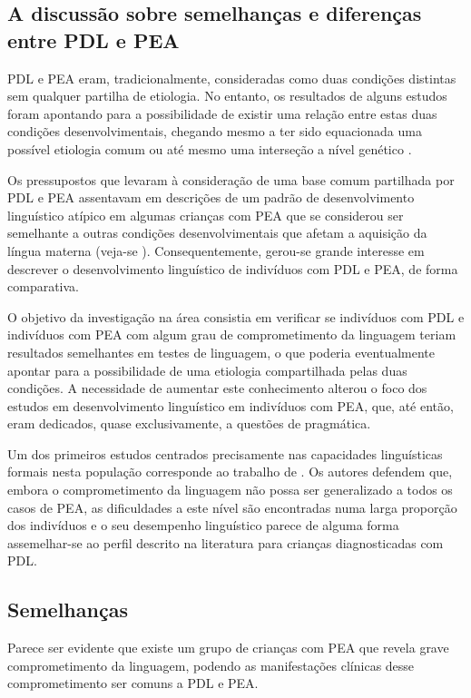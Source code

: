 \documentclass[output=paper,colorlinks,citecolor=brown,booklanguage=portuguese]{langscibook}
\begin{document}
\subsection{A discussão sobre semelhanças e diferenças entre PDL e PEA}
PDL e PEA eram, tradicionalmente, consideradas como duas condições distintas sem qualquer partilha de etiologia. No entanto, os resultados de alguns estudos foram apontando para a possibilidade de existir uma relação entre estas duas condições desenvolvimentais, chegando mesmo a ter sido equacionada uma possível etiologia comum ou até mesmo uma interseção a nível genético \citep{Bishop2010, Leyfer2008, Ruser2007}. 

Os pressupostos que levaram à consideração de uma base comum partilhada por PDL e PEA assentavam em descrições de um padrão de desenvolvimento linguístico atípico em algumas crianças com PEA que se considerou ser semelhante a outras condições desenvolvimentais que afetam a aquisição da língua materna (veja-se \citealp{TagerFlusberg2006a}). Consequentemente, gerou-se grande interesse em descrever o desenvolvimento linguístico de indivíduos com PDL e PEA, de forma comparativa. 

O objetivo da investigação na área consistia em verificar se indivíduos com PDL e indivíduos com PEA com algum grau de comprometimento da linguagem teriam resultados semelhantes em testes de linguagem, o que poderia eventualmente apontar para a possibilidade de uma etiologia compartilhada pelas duas condições. A necessidade de aumentar este conhecimento alterou o foco dos estudos em desenvolvimento linguístico em indivíduos com PEA, que, até então, eram dedicados, quase exclusivamente, a questões de pragmática. 

Um dos primeiros estudos centrados precisamente nas capacidades linguísticas formais nesta população corresponde ao trabalho de \citet{Kjelgaard2001}. Os autores defendem que, embora o comprometimento da linguagem não possa ser generalizado a todos os casos de PEA, as dificuldades a este nível são encontradas numa larga proporção dos indivíduos e o seu desempenho linguístico parece de alguma forma assemelhar-se ao perfil descrito na literatura para crianças diagnosticadas com PDL. 

\subsection{Semelhanças}
\largerpage

Parece ser evidente que existe um grupo de crianças com PEA que revela grave comprometimento da linguagem, podendo as manifestações clínicas desse comprometimento ser comuns a PDL e PEA. 
\end{document}
